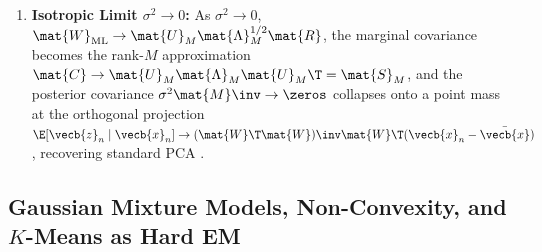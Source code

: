 \documentclass[../../../../master.tex]{subfiles}
\begin{document}
\begin{coremath}
\begin{enumerate}
  \item \textbf{Isotropic Limit $\sigma^2 \to 0$:} As $\sigma^2 \to 0$, $\mat{W}_{\mathrm{ML}} \to \mat{U}_M \mat{\Lambda}_M^{1/2}\mat{R}$, the marginal covariance becomes the rank-$M$ approximation $\mat{C} \to \mat{U}_M\mat{\Lambda}_M\mat{U}_M\T = \mat{S}_M$, and the posterior covariance $\sigma^2\mat{M}\inv \to \zeros$ collapses onto a point mass at the orthogonal projection $\E[\vecb{z}_n \mid \vecb{x}_n] \to (\mat{W}\T\mat{W})\inv\mat{W}\T(\vecb{x}_n - \bar{\vecb{x}})$, recovering standard PCA .
\end{enumerate}
\end{coremath}

\subsection{Gaussian Mixture Models, Non-Convexity, and $K$-Means as Hard EM}
\label{subsec:em:gmm_kmeans}
\end{document}
